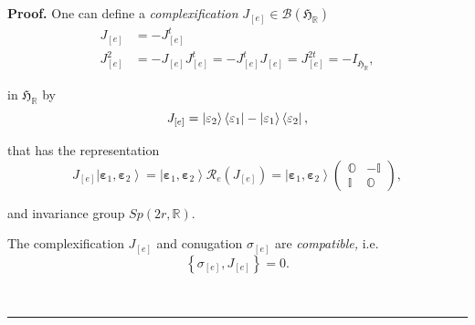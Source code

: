 \documentclass[aps,preprint]{revtex4}
\newenvironment{proof}[1][Proof]{\noindent\textbf{#1.} }{\ \rule{0.5em}{0.5em}}
\begin{document}
\begin{proof}
One can define a \emph{complexification} $J_{\left[ e\right] }\in \mathcal{B}%
\left( \mathfrak{H}_{\mathbb{R}}\right) $ 
\begin{align}
J_{\left[ e\right] } & =-J_{\left[ e\right] }^{t} \\
J_{\left[ e\right] }^{2} & =-J_{\left[ e\right] }J_{\left[ e\right]
}^{t}=-J_{\left[ e\right] }^{t}J_{\left[ e\right] }=J_{\left[ e\right]
}^{2t}=-I_{\mathfrak{H}_{\mathbb{R}}},
\end{align}

in $\mathfrak{H}_{\mathbb{R}}$ by 
\begin{equation}
J_{\left[ e\right] }=\left\vert \mathbf{\varepsilon}_{2}\right\rangle
\left\langle \mathbf{\varepsilon}_{1}\right\vert -\left\vert \mathbf{%
\varepsilon}_{1}\right\rangle \left\langle \mathbf{\varepsilon}%
_{2}\right\vert ,
\end{equation}

that has the representation%
\begin{equation}
J_{\left[ e\right] }\left\vert \mathbf{\varepsilon}_{1},\mathbf{\varepsilon }%
_{2}\right\rangle =\left\vert \mathbf{\varepsilon}_{1},\mathbf{\varepsilon }%
_{2}\right\rangle \mathcal{R}_{e}\left( J_{\left[ e\right] }\right)
=\left\vert \mathbf{\varepsilon}_{1},\mathbf{\varepsilon}_{2}\right\rangle
\left( 
\begin{array}{cc}
\mathbb{O} & -\mathbb{I} \\ 
\mathbb{I} & \mathbb{O}%
\end{array}
\right) ,
\end{equation}

and invariance group $Sp\left( 2r,\mathbb{R}\right) .$

The complexification $J_{\left[ e\right] }$ and conugation $\sigma_{\left[ e%
\right] }$ are \emph{compatible,} i.e. 
\begin{equation}
\left\{ \sigma_{\left[ e\right] },J_{\left[ e\right] }\right\} =0.
\end{equation}


\end{proof}
\end{document}
